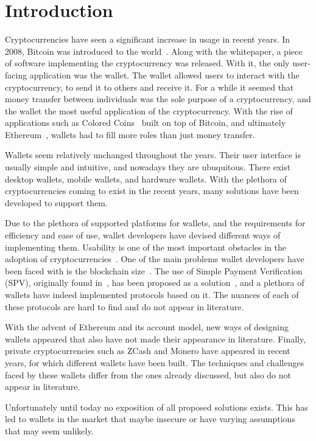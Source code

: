 \section{Introduction}
Cryptocurrencies have seen a significant increase in usage in recent years. In 2008, Bitcoin was introduced to the world~\cite{bitcoin}. 
Along with the whitepaper, a piece of software implementing the cryptocurrency was released. With it, the only user-facing application was the wallet. The wallet allowed users to interact with the cryptocurrency, to send it to others and receive it. For a while it seemed that money transfer between individuals was the sole purpose of a cryptocurrency, and the wallet the most useful application of the cryptocurrency. With the rise of applications such as Colored Coins~\cite{coloredcoins} built on top of Bitcoin, and ultimately Ethereum~\cite{wood2014ethereum}, wallets had to fill more roles than just money transfer.

Wallets seem relatively unchanged throughout the years. Their user interface is usually simple and intuitive, and nowadays they are ubuquitous. There exist desktop wallets, mobile wallets, and hardware wallets. With the plethora of cryptocurrencies coming to exist in the recent years, many solutions have been developed to support them.

Due to the plethora of supported platforms for wallets, and the requirements for efficiency and ease of use, wallet developers have devised different ways of implementing them.
Usability is one of the most important obstacles in the adoption of cryptocurrencies~\cite{meiklejohn2018top}.
One of the main problems wallet developers have been faced with is the blockchain size~\cite{meiklejohn2018top,sok}. The use of Simple Payment Verification (SPV), originally found in~\cite{bitcoin}, has been proposed as a solution~\cite{bip37}, and a plethora of wallets have indeed implemented protocols based on it. The nuances of each of these protocols are hard to find and do not appear in literature.

With the advent of Ethereum and its account model, new ways of designing wallets appeared that also have not made their appearance in literature. Finally, private cryptocurrencies such as ZCash and Monero have appeared in recent years, for which different wallets have been built. The techniques and challenges faced by these wallets differ from the ones already discussed, but also do not appear in literature.

Unfortunately until today no exposition of all proposed solutions exists. This has led to wallets in the market that maybe insecure or have varying assumptions that may seem unlikely.

